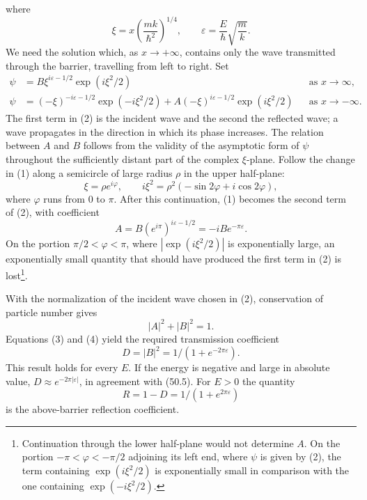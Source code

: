 where
\[
 \xi=x\left(\frac{mk}{\hbar^2}\right)^{1/4},\qquad
 \varepsilon=\frac E\hbar\sqrt{\frac mk}.
\]
We need the solution which, as $x\to+\infty$, contains only the wave
transmitted through the barrier, travelling from left to right. Set
\begin{align}
 \psi&=B\xi^{i\varepsilon-1/2}\exp(i\xi^2/2)
 &&\text{as }x\to\infty, \tag{1}\\
 \psi&=(-\xi)^{-i\varepsilon-1/2}\exp(-i\xi^2/2)
 +A(-\xi)^{i\varepsilon-1/2}\exp(i\xi^2/2)
 &&\text{as }x\to-\infty. \tag{2}
\end{align}
The first term in (2) is the incident wave and the second the reflected wave;
a wave propagates in the direction in which its phase increases. The relation
between $A$ and $B$ follows from the validity of the asymptotic form of $\psi$
throughout the sufficiently distant part of the complex $\xi$-plane. Follow
the change in (1) along a semicircle of large radius $\rho$ in the upper
half-plane:
\[
 \xi=\rho e^{i\varphi},\qquad
 i\xi^2=\rho^2(-\sin2\varphi+i\cos2\varphi),
\]
where $\varphi$ runs from 0 to $\pi$. After this continuation, (1) becomes the
second term of (2), with coefficient
\begin{equation}
 A=B(e^{i\pi})^{i\varepsilon-1/2}=-iBe^{-\pi\varepsilon}. \tag{3}
\end{equation}
On the portion $\pi/2<\varphi<\pi$, where
$|\exp(i\xi^2/2)|$ is exponentially large, an exponentially small quantity
that should have produced the first term in (2) is lost\footnote{Continuation
through the lower half-plane would not determine $A$. On the portion
$-\pi<\varphi<-\pi/2$ adjoining its left end, where $\psi$ is given by (2),
the term containing $\exp(i\xi^2/2)$ is exponentially small in comparison with
the one containing $\exp(-i\xi^2/2)$.}.

With the normalization of the incident wave chosen in (2), conservation of
particle number gives
\begin{equation}
 |A|^2+|B|^2=1. \tag{4}
\end{equation}
Equations (3) and (4) yield the required transmission coefficient
\[
 D=|B|^2=1/(1+e^{-2\pi\varepsilon}).
\]
This result holds for every $E$. If the energy is negative and large in
absolute value, $D\approx e^{-2\pi|\varepsilon|}$, in agreement with (50.5).
For $E>0$ the quantity
\[
 R=1-D=1/(1+e^{2\pi\varepsilon})
\]
is the above-barrier reflection coefficient.
